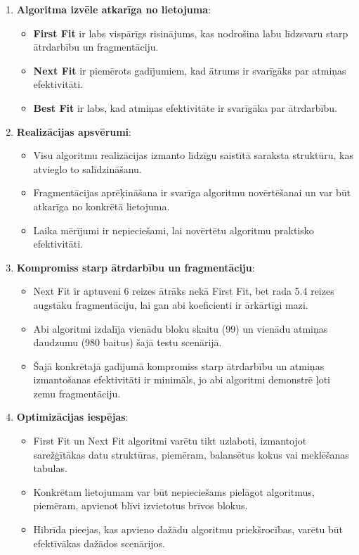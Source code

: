 \documentclass{report}
\begin{document}
	\begin{enumerate}
		\item \textbf{Algoritma izvēle atkarīga no lietojuma}:
		\begin{itemize}
			\item \textbf{First Fit} ir labs vispārīgs risinājums, kas nodrošina labu līdzsvaru starp ātrdarbību un fragmentāciju.
			\item \textbf{Next Fit} ir piemērots gadījumiem, kad ātrums ir svarīgāks par atmiņas efektivitāti.
			\item \textbf{Best Fit} ir labs, kad atmiņas efektivitāte ir svarīgāka par ātrdarbību.
		\end{itemize}
		
		\item \textbf{Realizācijas apsvērumi}:
		\begin{itemize}
			\item Visu algoritmu realizācijas izmanto līdzīgu saistītā saraksta struktūru, kas atvieglo to salīdzināšanu.
			\item Fragmentācijas aprēķināšana ir svarīga algoritmu novērtēšanai un var būt atkarīga no konkrētā lietojuma.
			\item Laika mērījumi ir nepieciešami, lai novērtētu algoritmu praktisko efektivitāti.
		\end{itemize}
		
		\item \textbf{Kompromiss starp ātrdarbību un fragmentāciju}:
		\begin{itemize}
			\item Next Fit ir aptuveni 6 reizes ātrāks nekā First Fit, bet rada 5.4 reizes augstāku fragmentāciju, lai gan abi koeficienti ir ārkārtīgi mazi.
			\item Abi algoritmi izdalīja vienādu bloku skaitu (99) un vienādu atmiņas daudzumu (980 baitus) šajā testu scenārijā.
			\item Šajā konkrētajā gadījumā kompromiss starp ātrdarbību un atmiņas izmantošanas efektivitāti ir minimāls, jo abi algoritmi demonstrē ļoti zemu fragmentāciju.
		\end{itemize}
		
		\item \textbf{Optimizācijas iespējas}:
		\begin{itemize}
			\item First Fit un Next Fit algoritmi varētu tikt uzlaboti, izmantojot sarežģītākas datu struktūras, piemēram, balansētus kokus vai meklēšanas tabulas.
			\item Konkrētam lietojumam var būt nepieciešams pielāgot algoritmus, piemēram, apvienot blīvi izvietotus brīvos blokus.
			\item Hibrīda pieejas, kas apvieno dažādu algoritmu priekšrocības, varētu būt efektīvākas dažādos scenārijos.
		\end{itemize}
		
	\end{enumerate}
	
\end{document}

